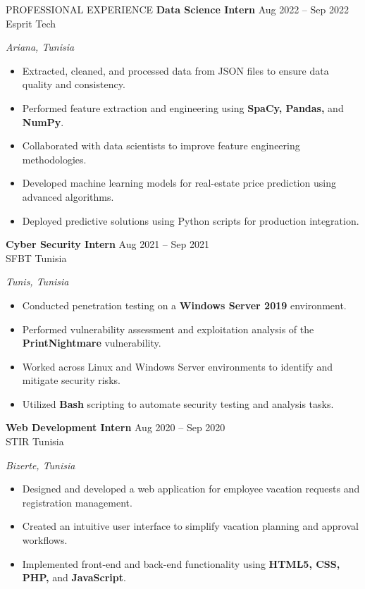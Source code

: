 \documentclass{resume} %
\begin{document}
\begin{rSection}{PROFESSIONAL EXPERIENCE}
\textbf{Data Science Intern} \hfill Aug 2022 -- Sep 2022\\
Esprit Tech \hfill
\parbox[t]{10cm}{\raggedleft\itshape Ariana, Tunisia}

\begin{itemize}
  \itemsep -3pt
  \item Extracted, cleaned, and processed data from JSON files to ensure data quality and consistency.
  \item Performed feature extraction and engineering using \textbf{SpaCy, Pandas,} and \textbf{NumPy}.
  \item Collaborated with data scientists to improve feature engineering methodologies.
  \item Developed machine learning models for real-estate price prediction using advanced algorithms.
  \item Deployed predictive solutions using Python scripts for production integration.
\end{itemize}

\textbf{Cyber Security Intern} \hfill Aug 2021 -- Sep 2021\\
SFBT Tunisia \hfill
\parbox[t]{10cm}{\raggedleft\itshape Tunis, Tunisia}

\begin{itemize}
  \itemsep -3pt
  \item Conducted penetration testing on a \textbf{Windows Server 2019} environment.
  \item Performed vulnerability assessment and exploitation analysis of the \textbf{PrintNightmare} vulnerability.
  \item Worked across Linux and Windows Server environments to identify and mitigate security risks.
  \item Utilized \textbf{Bash} scripting to automate security testing and analysis tasks.
\end{itemize}

\textbf{Web Development Intern} \hfill Aug 2020 -- Sep 2020\\
STIR Tunisia \hfill
\parbox[t]{10cm}{\raggedleft\itshape Bizerte, Tunisia}

\begin{itemize}
  \itemsep -3pt
  \item Designed and developed a web application for employee vacation requests and registration management.
  \item Created an intuitive user interface to simplify vacation planning and approval workflows.
  \item Implemented front-end and back-end functionality using \textbf{HTML5, CSS, PHP,} and \textbf{JavaScript}.
\end{itemize}

\end{rSection}
\end{document}
